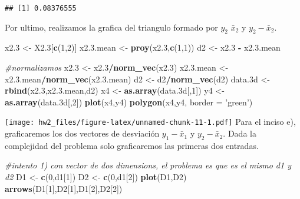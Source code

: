\documentclass[]{article}
\newenvironment{Shaded}{\begin{snugshade}}{\end{snugshade}}
\newcommand{\CommentTok}[1]{\textcolor[rgb]{0.56,0.35,0.01}{\textit{#1}}}
\newcommand{\DataTypeTok}[1]{\textcolor[rgb]{0.13,0.29,0.53}{#1}}
\newcommand{\DecValTok}[1]{\textcolor[rgb]{0.00,0.00,0.81}{#1}}
\newcommand{\FloatTok}[1]{\textcolor[rgb]{0.00,0.00,0.81}{#1}}
\newcommand{\KeywordTok}[1]{\textcolor[rgb]{0.13,0.29,0.53}{\textbf{#1}}}
\newcommand{\NormalTok}[1]{#1}
\newcommand{\OperatorTok}[1]{\textcolor[rgb]{0.81,0.36,0.00}{\textbf{#1}}}
\newcommand{\StringTok}[1]{\textcolor[rgb]{0.31,0.60,0.02}{#1}}
\begin{document}
\begin{verbatim}
## [1] 0.08376555
\end{verbatim}

Por ultimo, realizamos la grafica del triangulo formado por \(y_2\)
\(\bar{x}_2\) y \(y_2 - \bar{x}_2\).

\begin{Shaded}
\begin{Highlighting}[]
\NormalTok{x2}\FloatTok{.3}\NormalTok{ <-}\StringTok{ }\NormalTok{X2}\FloatTok{.3}\NormalTok{[}\KeywordTok{c}\NormalTok{(}\DecValTok{1}\NormalTok{,}\DecValTok{2}\NormalTok{)]}
\NormalTok{x2.}\FloatTok{3.}\NormalTok{mean <-}\StringTok{ }\KeywordTok{proy}\NormalTok{(x2}\FloatTok{.3}\NormalTok{,}\KeywordTok{c}\NormalTok{(}\DecValTok{1}\NormalTok{,}\DecValTok{1}\NormalTok{))}
\NormalTok{d2 <-}\StringTok{ }\NormalTok{x2}\FloatTok{.3} \OperatorTok{-}\StringTok{ }\NormalTok{x2.}\FloatTok{3.}\NormalTok{mean}

\CommentTok{#normalizamos}
\NormalTok{x2}\FloatTok{.3}\NormalTok{ <-}\StringTok{ }\NormalTok{x2}\FloatTok{.3}\OperatorTok{/}\KeywordTok{norm_vec}\NormalTok{(x2}\FloatTok{.3}\NormalTok{)}
\NormalTok{x2.}\FloatTok{3.}\NormalTok{mean <-}\StringTok{ }\NormalTok{x2.}\FloatTok{3.}\NormalTok{mean}\OperatorTok{/}\KeywordTok{norm_vec}\NormalTok{(x2.}\FloatTok{3.}\NormalTok{mean)}
\NormalTok{d2 <-}\StringTok{ }\NormalTok{d2}\OperatorTok{/}\KeywordTok{norm_vec}\NormalTok{(d2)}
\NormalTok{data}\FloatTok{.3}\NormalTok{d <-}\KeywordTok{rbind}\NormalTok{(x2}\FloatTok{.3}\NormalTok{,x2.}\FloatTok{3.}\NormalTok{mean,d2)}
\NormalTok{x4 <-}\StringTok{ }\KeywordTok{as.array}\NormalTok{(data}\FloatTok{.3}\NormalTok{d[,}\DecValTok{1}\NormalTok{])}
\NormalTok{y4 <-}\StringTok{ }\KeywordTok{as.array}\NormalTok{(data}\FloatTok{.3}\NormalTok{d[,}\DecValTok{2}\NormalTok{])}
\KeywordTok{plot}\NormalTok{(x4,y4)}
\KeywordTok{polygon}\NormalTok{(x4,y4, }\DataTypeTok{border =} \StringTok{'green'}\NormalTok{)}
\end{Highlighting}
\end{Shaded}

\texttt{[image: hw2\_files/figure-latex/unnamed-chunk-11-1.pdf]} Para el
inciso e), graficaremos los dos vectores de desviación
\(y_1 - \bar{x}_1\) y \(y_2 - \bar{x}_2\). Dada la complejidad del
problema solo graficaremos las primeras dos entradas.

\begin{Shaded}
\begin{Highlighting}[]
\CommentTok{#intento 1) con vector de dos dimensions, el problema es que es el mismo d1 y d2}
\NormalTok{D1 <-}\StringTok{ }\KeywordTok{c}\NormalTok{(}\DecValTok{0}\NormalTok{,d1[}\DecValTok{1}\NormalTok{])}
\NormalTok{D2 <-}\StringTok{ }\KeywordTok{c}\NormalTok{(}\DecValTok{0}\NormalTok{,d1[}\DecValTok{2}\NormalTok{])}
\KeywordTok{plot}\NormalTok{(D1,D2)}
\KeywordTok{arrows}\NormalTok{(D1[}\DecValTok{1}\NormalTok{],D2[}\DecValTok{1}\NormalTok{],D1[}\DecValTok{2}\NormalTok{],D2[}\DecValTok{2}\NormalTok{])}
\end{Highlighting}
\end{Shaded}
\end{document}

